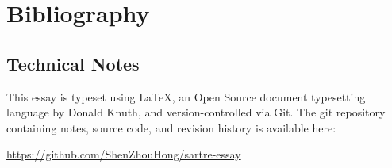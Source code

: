 \chapter{Bibliography}

\nocite{*}
\printbibliography[heading=none]

\section*{Technical Notes}
This essay is typeset using \LaTeX, an Open Source document typesetting language
by Donald Knuth, and version-controlled via Git. The git repository containing notes, source code, and revision history is available here:

\url{https://github.com/ShenZhouHong/sartre-essay}




